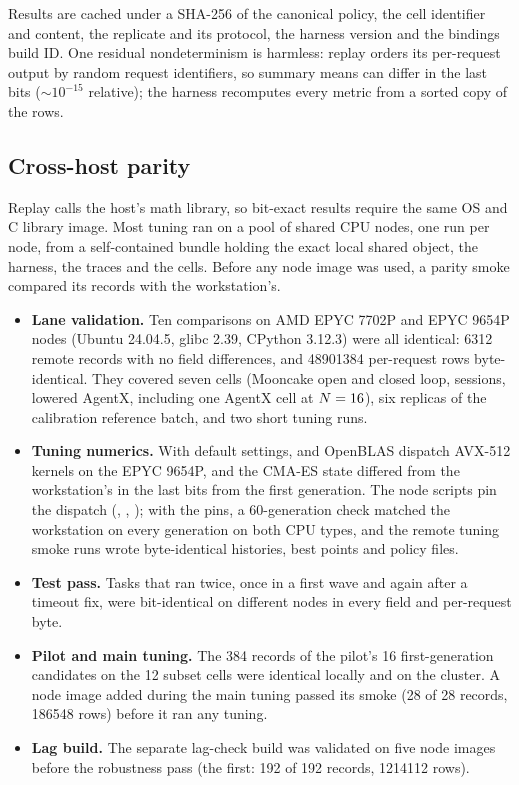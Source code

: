 Results are cached under a SHA-256 of the canonical policy, the cell identifier and content, the
replicate and its protocol, the harness version and the bindings build ID. One residual
nondeterminism is harmless: replay orders its per-request output by random request identifiers, so
summary means can differ in the last bits ($\sim 10^{-15}$ relative); the harness recomputes every
metric from a sorted copy of the rows.

\subsection{Cross-host parity}
\label{app:parity}

Replay calls the host's math library, so bit-exact results require the same OS and C library
image. Most tuning ran on a pool of shared CPU nodes, one run per node, from a self-contained bundle holding the exact local shared object, the harness, the traces
and the cells. Before any node image was used, a parity smoke compared its records with the
workstation's.
\begin{itemize}
  \item \textbf{Lane validation.} Ten comparisons on AMD EPYC 7702P and EPYC 9654P nodes (Ubuntu
    24.04.5, glibc 2.39, CPython 3.12.3) were all identical: \num{6312} remote records with no field
    differences, and \num{48901384} per-request rows byte-identical. They covered seven cells
    (Mooncake open and closed loop, sessions, lowered AgentX, including one AgentX cell at
    $N = 16$), six replicas of the calibration reference batch, and two short tuning runs.
  \item \textbf{Tuning numerics.} With default settings,  and OpenBLAS dispatch AVX-512
    kernels on the EPYC 9654P, and the CMA-ES state differed from the workstation's in the last bits
    from the first generation. The node scripts pin the dispatch (,
    , ); with the pins, a 60-generation
    check matched the workstation on every generation on both CPU types, and the remote tuning
    smoke runs wrote byte-identical histories, best points and policy files.
  \item \textbf{Test pass.} Tasks that ran twice, once in a first wave and again after a timeout
    fix, were bit-identical on different nodes in every field and per-request byte.
  \item \textbf{Pilot and main tuning.} The 384 records of the pilot's 16 first-generation candidates
    on the 12 subset cells were identical locally and on the cluster. A node image added during the
    main tuning passed its smoke (28 of 28 records, \num{186548} rows) before it ran any tuning.
  \item \textbf{Lag build.} The separate lag-check build was validated on five node images before
    the robustness pass (the first: 192 of 192 records, \num{1214112} rows).
\end{itemize}
